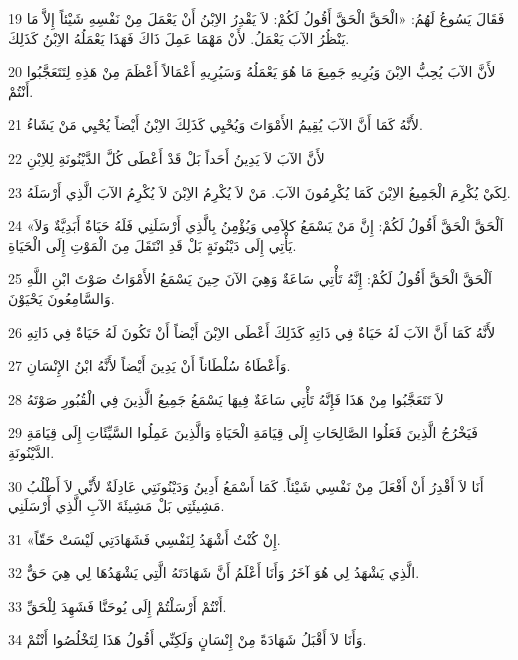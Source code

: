 \par 19 فَقَالَ يَسُوعُ لَهُمُ: «الْحَقَّ الْحَقَّ أَقُولُ لَكُمْ: لاَ يَقْدِرُ الاِبْنُ أَنْ يَعْمَلَ مِنْ نَفْسِهِ شَيْئاً إِلاَّ مَا يَنْظُرُ الآبَ يَعْمَلُ. لأَنْ مَهْمَا عَمِلَ ذَاكَ فَهَذَا يَعْمَلُهُ الاِبْنُ كَذَلِكَ.
\par 20 لأَنَّ الآبَ يُحِبُّ الاِبْنَ وَيُرِيهِ جَمِيعَ مَا هُوَ يَعْمَلُهُ وَسَيُرِيهِ أَعْمَالاً أَعْظَمَ مِنْ هَذِهِ لِتَتَعَجَّبُوا أَنْتُمْ.
\par 21 لأَنَّهُ كَمَا أَنَّ الآبَ يُقِيمُ الأَمْوَاتَ وَيُحْيِي كَذَلِكَ الاِبْنُ أَيْضاً يُحْيِي مَنْ يَشَاءُ.
\par 22 لأَنَّ الآبَ لاَ يَدِينُ أَحَداً بَلْ قَدْ أَعْطَى كُلَّ الدَّيْنُونَةِ لِلاِبْنِ
\par 23 لِكَيْ يُكْرِمَ الْجَمِيعُ الاِبْنَ كَمَا يُكْرِمُونَ الآبَ. مَنْ لاَ يُكْرِمُ الاِبْنَ لاَ يُكْرِمُ الآبَ الَّذِي أَرْسَلَهُ.
\par 24 «اَلْحَقَّ الْحَقَّ أَقُولُ لَكُمْ: إِنَّ مَنْ يَسْمَعُ كلاَمِي وَيُؤْمِنُ بِالَّذِي أَرْسَلَنِي فَلَهُ حَيَاةٌ أَبَدِيَّةٌ وَلاَ يَأْتِي إِلَى دَيْنُونَةٍ بَلْ قَدِ انْتَقَلَ مِنَ الْمَوْتِ إِلَى الْحَيَاةِ.
\par 25 اَلْحَقَّ الْحَقَّ أَقُولُ لَكُمْ: إِنَّهُ تَأْتِي سَاعَةٌ وَهِيَ الآنَ حِينَ يَسْمَعُ الأَمْوَاتُ صَوْتَ ابْنِ اللَّهِ وَالسَّامِعُونَ يَحْيَوْنَ.
\par 26 لأَنَّهُ كَمَا أَنَّ الآبَ لَهُ حَيَاةٌ فِي ذَاتِهِ كَذَلِكَ أَعْطَى الاِبْنَ أَيْضاً أَنْ تَكُونَ لَهُ حَيَاةٌ فِي ذَاتِهِ
\par 27 وَأَعْطَاهُ سُلْطَاناً أَنْ يَدِينَ أَيْضاً لأَنَّهُ ابْنُ الإِنْسَانِ.
\par 28 لاَ تَتَعَجَّبُوا مِنْ هَذَا فَإِنَّهُ تَأْتِي سَاعَةٌ فِيهَا يَسْمَعُ جَمِيعُ الَّذِينَ فِي الْقُبُورِ صَوْتَهُ
\par 29 فَيَخْرُجُ الَّذِينَ فَعَلُوا الصَّالِحَاتِ إِلَى قِيَامَةِ الْحَيَاةِ وَالَّذِينَ عَمِلُوا السَّيِّئَاتِ إِلَى قِيَامَةِ الدَّيْنُونَةِ.
\par 30 أَنَا لاَ أَقْدِرُ أَنْ أَفْعَلَ مِنْ نَفْسِي شَيْئاً. كَمَا أَسْمَعُ أَدِينُ وَدَيْنُونَتِي عَادِلَةٌ لأَنِّي لاَ أَطْلُبُ مَشِيئَتِي بَلْ مَشِيئَةَ الآبِ الَّذِي أَرْسَلَنِي.
\par 31 «إِنْ كُنْتُ أَشْهَدُ لِنَفْسِي فَشَهَادَتِي لَيْسَتْ حَقّاً.
\par 32 الَّذِي يَشْهَدُ لِي هُوَ آخَرُ وَأَنَا أَعْلَمُ أَنَّ شَهَادَتَهُ الَّتِي يَشْهَدُهَا لِي هِيَ حَقٌّ.
\par 33 أَنْتُمْ أَرْسَلْتُمْ إِلَى يُوحَنَّا فَشَهِدَ لِلْحَقِّ.
\par 34 وَأَنَا لاَ أَقْبَلُ شَهَادَةً مِنْ إِنْسَانٍ وَلَكِنِّي أَقُولُ هَذَا لِتَخْلُصُوا أَنْتُمْ.
